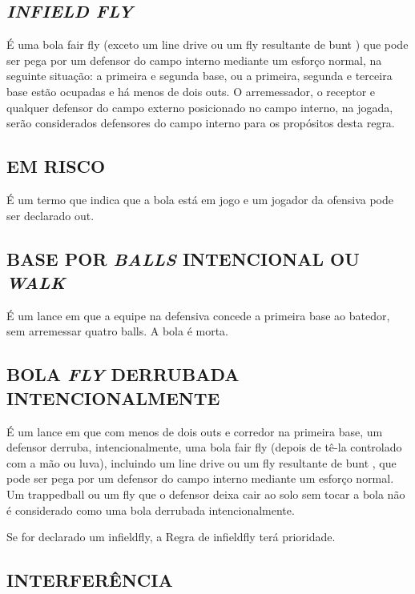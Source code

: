 \subsection{\textit{INFIELD FLY}}

É uma bola \gls{fair fly} (exceto um \gls{line drive} ou um \gls{fly} resultante de \gls{bunt} ) que pode ser pega por um defensor do campo interno mediante um esforço normal, na seguinte situação: a primeira e segunda base, ou a primeira, segunda e terceira base estão ocupadas e há menos de dois \glspl{out}. O arremessador, o receptor e qualquer defensor do campo externo posicionado no campo interno, na jogada, serão considerados defensores do campo interno para os propósitos desta regra.

\subsection{EM RISCO}

É um termo que indica que a bola está em jogo e um jogador da ofensiva pode ser declarado \gls{out}.

\subsection{BASE POR \textit{BALLS} INTENCIONAL OU \textit{WALK}}
É um lance em que a equipe na defensiva concede a primeira base ao batedor, sem arremessar quatro \glspl{ball}. A bola é morta.


\subsection{BOLA \textit{FLY} DERRUBADA INTENCIONALMENTE}

É um lance em que com menos de dois \glspl{out} e corredor na primeira base, um defensor derruba, intencionalmente, uma bola \gls{fair fly} (depois de tê-la controlado com a mão ou luva), incluindo um \gls{line drive} ou um \gls{fly} resultante de \gls{bunt} , que pode ser pega por um defensor do campo interno mediante um  esforço normal. Um \gls{trappedball} ou um \gls{fly} que o defensor deixa cair ao solo sem tocar a bola não é considerado como uma bola derrubada intencionalmente.

Se for declarado um \gls{infieldfly}, a Regra de \gls{infieldfly} terá prioridade.

\subsection{INTERFERÊNCIA}

